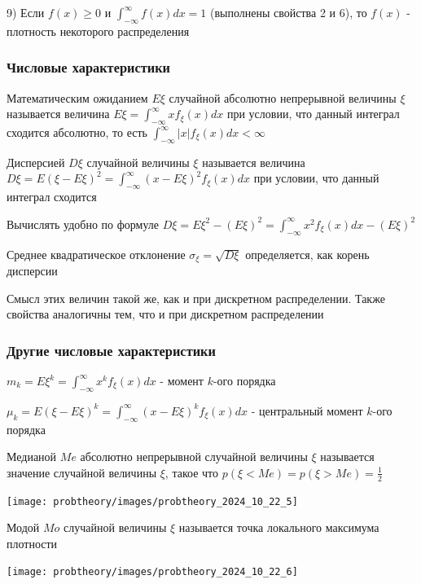 \documentclass[12pt]{article}
\begin{document}
    9) \Ths Если $f(x) \geq 0$ и $\int_{-\infty}^{\infty} f(x)dx = 1$ (выполнены свойства 2 и 6), то $f(x)$ - плотность некоторого распределения

    \hypertarget{attributesofcontinuousrandomvariable}{}

    \subsubsection{Числовые характеристики}

    \Def Математическим ожиданием $E\xi$ случайной абсолютно непрерывной величины $\xi$ называется величина $E\xi = \int_{-\infty}^{\infty} xf_\xi(x) dx$ 
    при условии, что данный интеграл сходится абсолютно, то есть $\int_{-\infty}^\infty |x|f_\xi(x)dx < \infty$

    \Def Дисперсией $D\xi$ случайной величины $\xi$ называется величина $D\xi = E(\xi - E\xi)^2 = \int_{-\infty}^\infty (x - E\xi)^2 f_\xi(x) dx$ при условии,
    что данный интеграл сходится

    \Notas Вычислять удобно по формуле $D\xi = E\xi^2 - (E\xi)^2 = \int_{-\infty}^\infty x^2 f_\xi(x)dx - (E\xi)^2$

    \Def Среднее квадратическое отклонение $\sigma_\xi = \sqrt{D\xi}$ определяется, как корень дисперсии

    Смысл этих величин такой же, как и при дискретном распределении. Также свойства аналогичны тем, что и при дискретном распределении

    \subsubsection{Другие числовые характеристики}

    $m_k = E\xi^k = \int_{-\infty}^\infty x^k f_\xi(x)dx$ - момент $k$-ого порядка

    $\mu_k = E(\xi - E\xi)^k = \int_{-\infty}^\infty (x - E\xi)^k f_\xi(x)dx$ - центральный момент $k$-ого порядка

    \Def Медианой $Me$ абсолютно непрерывной случайной величины $\xi$ называется значение случайной величины $\xi$, такое что $p(\xi < Me) = p(\xi > Me) = \frac{1}{2}$
    
    \texttt{[image: probtheory/images/probtheory\_2024\_10\_22\_5]}

    \Def Модой $Mo$ случайной величины $\xi$ называется точка локального максимума плотности

    \texttt{[image: probtheory/images/probtheory\_2024\_10\_22\_6]}
\end{document}
